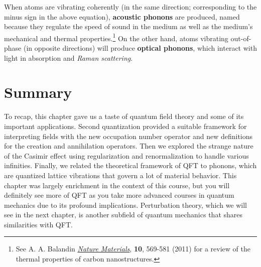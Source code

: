 When atoms are vibrating coherently (in the same direction; corresponding to the minus sign in the above equation), \textbf{acoustic phonons} are produced, named because they regulate the speed of sound in the medium as well as the medium's mechanical and thermal properties.\footnote{See A. A. Balandin \href{https://www.nature.com/nmat/journal/v10/n8/full/nmat3064.html}{\emph{Nature Materials}}, \textbf{10}, 569-581 (2011) for a review of the thermal properties of carbon nanostructures.} On the other hand, atoms vibrating out-of-phase (in opposite directions) will produce \textbf{optical phonons}, which interact with light in absorption and \emph{Raman scattering}. 


\section{Summary}
To recap, this chapter gave us a taste of quantum field theory and some of its important applications. Second quantization provided a suitable framework for interpreting fields with the new occupation number operator and new definitions for the creation and annihilation operators. Then we explored the strange nature of the Casimir effect using regularization and renormalization to handle various infinities. Finally, we related the theoretical framework of QFT to phonons, which are quantized lattice vibrations that govern a lot of material behavior. This chapter was largely enrichment in the context of this course, but you will definitely see more of QFT as you take more advanced courses in quantum mechanics due to its profound implications. Perturbation theory, which we will see in the next chapter, is another subfield of quantum mechanics that shares similarities with QFT.


%